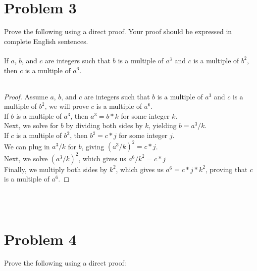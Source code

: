 \documentclass{amsart}
\theoremstyle{definition}
\theoremstyle{Exercise}
\theoremstyle{remark}
\theoremstyle{rule}
\numberwithin{equation}{section}
\begin{document}
 \newpage


\section*{Problem 3}

Prove the following using a direct proof. Your proof should be expressed in complete English sentences.
\\\\

If $a$, $b$, and $c$ are integers such that $b$ is a multiple of $a^3$ and $c$ is a multiple of $b^2$, then $c$ is a multiple of $a^6$.
\\\\
\begin{proof}
Assume $a$, $b$, and $c$ are integers such that $b$ is a multiple of $a^3$ and $c$ is a multiple of $b^2$, we will prove $c$ is a multiple of $a^6$.\\
If $b$ is a multiple of $a^3$, then $a^3 = b*k$ for some integer $k$.\\
Next, we solve for $b$ by dividing both sides by $k$, yielding $b = a^3/k$.\\
If $c$ is a multiple of $b^2$, then $b^2 = c*j$ for some integer $j$.\\
We can plug in $a^3/k$ for $b$, giving $(a^3/k)^2 = c*j$.\\
Next, we solve $(a^3/k)^2$, which gives us $a^6/k^2 = c*j$\\
Finally, we multiply both sides by $k^2$, which gives us $a^6 = c*j*k^2$, proving that $c$ is a multiple of $a^6$.
\end{proof}


\\\\

 \newpage
\section*{Problem 4}
Prove the following using a direct proof:
\\
\end{document}
